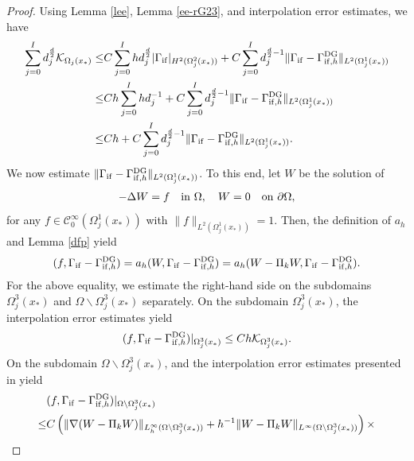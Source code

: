 \documentclass[1996/10/24]{amsart}
\theoremstyle{definition}
\numberwithin{equation}{section}
\begin{document}
\begin{proof}
Using Lemma \ref{lee}, Lemma \ref{ee-rG23}, and interpolation error estimates, we have
\begin{align}
\sum_{j=0}^Id_j^{\frac{d}{2}}\mathcal{K}_{\Omega_j(x_{\ast})}\leq& C\sum_{j=0}^Ihd_j^{\frac{d}{2}}|\Gamma_{{\rm if}}|_{H^2(\Omega_j^2(x_{\ast}))}+C\sum_{j=0}^Id_j^{\frac{d}{2}-1}\|\Gamma_{{\rm if}}-\Gamma_{{\rm if},h}^{{\rm DG}}\|_{L^2(\Omega_j^1(x_{\ast}))}\nonumber\\
\leq& Ch\sum_{j=0}^Ihd_j^{-1}+C\sum_{j=0}^Id_j^{\frac{d}{2}-1}\|\Gamma_{{\rm if}}-\Gamma_{{\rm if},h}^{{\rm DG}}\|_{L^2(\Omega_j^1(x_{\ast}))}\label{rG23-L1-DG-proof:2}\\
\leq& Ch+C\sum_{j=0}^Id_j^{\frac{d}{2}-1}\|\Gamma_{{\rm if}}-\Gamma_{{\rm if},h}^{{\rm DG}}\|_{L^2(\Omega_j^1(x_{\ast}))}.\nonumber
\end{align}
We now estimate $\|\Gamma_{{\rm if}}-\Gamma_{{\rm if},h}^{{\rm DG}}\|_{L^2(\Omega_j^1(x_{\ast}))}$. To this end, let $W$ be the solution of
\begin{align*}
-\Delta W= f\quad {\rm in}~\Omega,\quad W=0\quad {\rm on}~\partial\Omega,
\end{align*}
for any $f\in\mathcal{C}_0^{\infty}(\Omega_j^1(x_{\ast}))$ with $\|f\|_{L^2(\Omega_j^1(x_{\ast}))}=1$. Then, the definition of $a_h$ and Lemma \ref{dfp} yield
\begin{align*}
(f,\Gamma_{{\rm if}}-\Gamma_{{\rm if},h}^{{\rm DG}})=a_h(W,\Gamma_{{\rm if}}-\Gamma_{{\rm if},h}^{{\rm DG}})=a_h(W-\Pi_k W,
\Gamma_{{\rm if}}-\Gamma_{{\rm if},h}^{{\rm DG}}).
\end{align*}
For the above equality, we estimate the right-hand side on the subdomains $\Omega_j^3(x_{\ast})$ and
$\Omega\backslash\Omega_j^3(x_{\ast})$ separately. On the subdomain $\Omega_j^3(x_{\ast})$, the interpolation error estimates yield
\begin{align*}
(f,\Gamma_{{\rm if}}-\Gamma_{{\rm if},h}^{{\rm DG}})|_{\Omega_j^3(x_{\ast})}\leq Ch\mathcal{K}_{\Omega_j^3(x_{\ast})}.
\end{align*}
On the subdomain $\Omega\backslash\Omega_j^3(x_{\ast})$, \cite[Lemma 3.8]{lc2026} and the interpolation error estimates presented in \cite[Lemma 4.1]{glrs2009} yield
\begin{align*}
&(f,\Gamma_{{\rm if}}-\Gamma_{{\rm if},h}^{{\rm DG}})|_{\Omega\backslash\Omega_j^3(x_{\ast})}\\
\leq &C\left(\|\nabla(W-\Pi_kW)\|_{L_h^{\infty}(\Omega\backslash\Omega_j^3(x_{\ast}))}+h^{-1}\|W-\Pi_kW\|_{L^{\infty}(\Omega\backslash\Omega_j^3(x_{\ast}))}\right)\times\\

\end{align*}
\end{proof}
\end{document}
